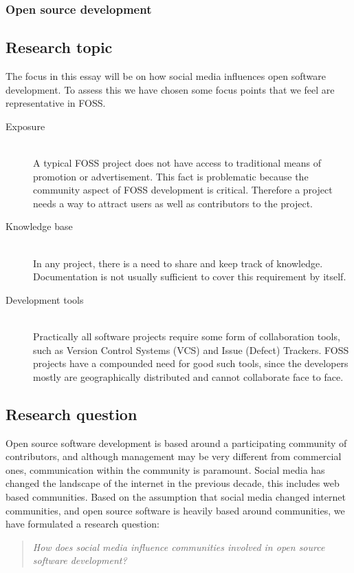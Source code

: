 \documentclass[a4paper,11pt]{article} %
\begin{document}
\subsubsection{Open source development}

\subsection{Research topic}

The focus in this essay will be on how social media influences open software development. To assess
this we have chosen some focus points that we feel are representative in FOSS. 

\begin{description}
  \item[Exposure] \hfill \\
  A typical FOSS project does not have access to traditional means of
  promotion or advertisement. This fact is problematic because the community
  aspect of FOSS development is critical. Therefore a project needs a way to
  attract users as well as contributors to the project.
  \item[Knowledge base] \hfill \\ In any project, there is a need to
	share and keep track of knowledge. Documentation is not usually
	sufficient to cover this requirement by itself.
	\item[Development tools] \hfill \\
	Practically all software projects
	require some form of collaboration tools, such as Version Control
	Systems (VCS) and Issue (Defect) Trackers. FOSS projects have a
	compounded need for good such tools, since the developers mostly
	are geographically distributed and cannot collaborate face to
	face. 

\end{description}

\subsection{Research question}

Open source software development is based around a participating community of contributors, and although
management may be very different from commercial ones, communication within the community is paramount.
Social media has changed the landscape of the internet in the previous decade\cite{Kaplan201059}, this includes web based communities. Based on the assumption that social media changed internet communities, and open source
software is heavily based around communities, we have formulated a research question:
\begin{quote}
\textit{How does social media influence communities involved in open source software development?}
\end{quote}
\end{document}
